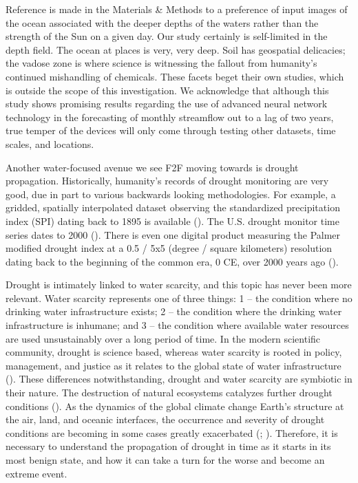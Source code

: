 \begin{refsection}
Reference is made in the Materials \& Methods to a preference of input images of the ocean associated with the deeper depths of the waters rather than the strength of the Sun on a given day. Our study certainly is self-limited in the depth field. The ocean at places is very, very deep. Soil has geospatial delicacies; the vadose zone is where science is witnessing the fallout from humanity’s continued mishandling of chemicals. These facets beget their own studies, which is outside the scope of this investigation. We acknowledge that although this study shows promising results regarding the use of advanced neural network technology in the forecasting of monthly streamflow out to a lag of two years, true temper of the devices will only come through testing other datasets, time scales, and locations. 

Another water-focused avenue we see F2F moving towards is drought propagation. Historically, humanity’s records of drought monitoring are very good, due in part to various backwards looking methodologies. For example, a gridded, spatially interpolated dataset observing the standardized precipitation index (SPI) dating back to 1895 is available (\cite{noaa_monthly}). The U.S. drought monitor time series dates to 2000 (\cite{svoboda2002drought}). There is even one digital product measuring the Palmer modified drought index at a 0.5 / 5x5 (degree / square kilometers) resolution dating back to the beginning of the common era, 0 CE, over 2000 years ago (\cite{noaa_paleo}).

Drought is intimately linked to water scarcity, and this topic has never been more relevant. Water scarcity represents one of three things: 1 – the condition where no drinking water infrastructure exists; 2 – the condition where the drinking water infrastructure is inhumane; and 3 – the condition where available water resources are used unsustainably over a long period of time. In the modern scientific community, drought is science based, whereas water scarcity is rooted in policy, management, and justice as it relates to the global state of water infrastructure (\cite{van2013making}). These differences notwithstanding, drought and water scarcity are symbiotic in their nature. The destruction of natural ecosystems catalyzes further drought conditions (\cite{getirana2021brazil}). As the dynamics of the global climate change Earth’s structure at the air, land, and oceanic interfaces, the occurrence and severity of drought conditions are becoming in some cases greatly exacerbated (\cite{king2020role}; \cite{naumann2021increased}). Therefore, it is necessary to understand the propagation of drought in time as it starts in its most benign state, and how it can take a turn for the worse and become an extreme event.


\end{refsection}
